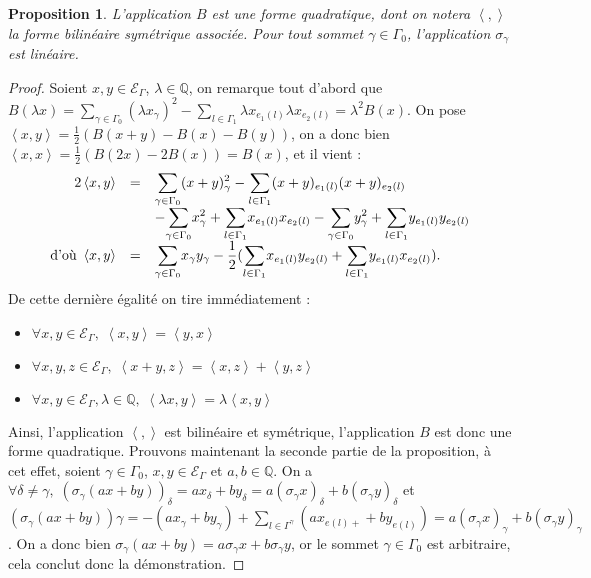 \documentclass[a4paper,11pt]{article}
\newtheorem{prop}[thm]{Proposition}%
\newcommand{\ps}[2]{\left\langle#1,#2\right\rangle}
\newcommand{\EG}{\mathscr{E}_\Gamma}
\newcommand{\dps}{\displaystyle}
\begin{document}
		\begin{prop}
			L'application $B$ est une forme quadratique, dont on notera $\ps{}{}$ la forme bilinéaire symétrique associée. Pour tout sommet $\gamma\in\Gamma_0$, l'application $\sigma_\gamma$ est linéaire.
		\end{prop}
		\begin{proof}
			Soient $x,y\in\EG$, $\lambda\in\mathbb{Q}$, on remarque tout d'abord que $B(\lambda x)=\sum_{\gamma\in\Gamma_0}(\lambda x_\gamma)^2-\sum_{l\in\Gamma_1}\lambda x_{e_1(l)}\lambda x_{e_2(l)}=\lambda^2B(x)$. On pose $\ps{x}{y}=\frac{1}{2}(B(x+y)-B(x)-B(y))$, on a donc bien $\ps{x}{x}=\frac{1}{2}(B(2x)-2B(x))=B(x)$, et il vient :
			\[
		\begin{array}{>{\dps}r>{\dps}l>{\dps}l}
			2\ps{x}{y}&=& \underset{\gamma\in\Gamma_0}{\sum}(x+y)_\gamma^2 -\underset{l\in\Gamma_1}{\sum}(x+y)_{e_1(l)}(x+y)_{e_2(l)}\\
		&&-\underset{\gamma\in\Gamma_0}{\sum}x_\gamma^2 +\underset{l\in\Gamma_1}{\sum}x_{e_1(l)}x_{e_2(l)}-\underset{\gamma\in\Gamma_0}{\sum}y_\gamma^2 +\underset{l\in\Gamma_1}{\sum}y_{e_1(l)}y_{e_2(l)}\\
		\text{d'où }\ps{x}{y}&=&  \underset{\gamma\in\Gamma_0}{\sum}x_\gamma y_\gamma -\frac{1}{2}(\underset{l\in\Gamma_1}{\sum}x_{e_1(l)} y_{e_2(l)}+\underset{l\in\Gamma_1}{\sum}y_{e_1(l)} x_{e_2(l)}).
		\end{array}
			\]
			De cette dernière égalité on tire immédiatement :
			\begin{itemize}
					\item $\forall x,y\in\EG,\; \ps{x}{y}=\ps{y}{x}$
					\item $\forall x,y,z\in\EG,\; \ps{x+y}{z}=\ps{x}{z}+\ps{y}{z}$
					\item $\forall x,y\in\EG,\lambda\in\mathbb Q,\;\ps{\lambda x}{y}=\lambda\ps{x}{y}$
			\end{itemize}
			Ainsi, l'application $\ps{}{}$ est bilinéaire et symétrique, l'application $B$ est donc une forme quadratique. Prouvons maintenant la seconde partie de la proposition, à cet effet, soient $\gamma\in\Gamma_0$, $x,y\in\EG$ et $a,b\in\mathbb Q$. On a $\forall\delta\neq\gamma,\;(\sigma_\gamma(ax+by))_\delta=ax_\delta+by_\delta=a(\sigma_\gamma x)_\delta+b(\sigma_\gamma y)_\delta$ et $(\sigma_\gamma (ax+by))\gamma=-(ax_\gamma+by_\gamma)+\sum_{l\in\Gamma^\gamma}(ax_{e(l)+}+by_{e(l)})=a(\sigma_\gamma x)_\gamma+b(\sigma_\gamma y)_\gamma$. On a donc bien $\sigma_\gamma(ax+by)=a\sigma_\gamma x+b\sigma_\gamma y$, or le sommet $\gamma\in\Gamma_{0}$ est arbitraire, cela conclut donc la démonstration.
		\end{proof}
\end{document}
